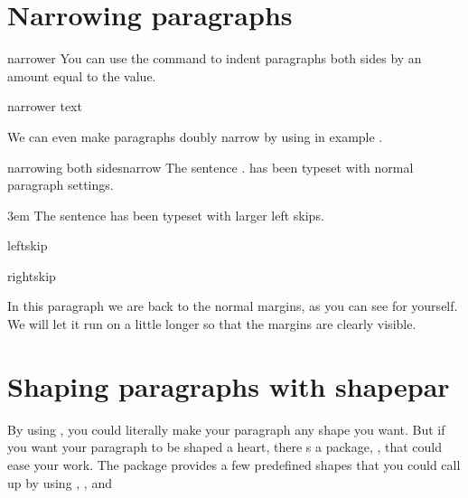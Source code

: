 \section{Narrowing paragraphs}

\begin{docCommand}{narrower}{}
You can use the command  to indent paragraphs both sides by  an amount equal to the
 value.
\end{docCommand}

\begin{teXXX}
 \def\narrower{%
   \advance\leftskip\parindent
   \advance\rightskip\parindent}
\end{teXXX}

\begin{texexample}{narrower text}{}
\onepar

\narrower\small
\onepar\par
\end{texexample}

We can even make paragraphs doubly narrow by using   in example .

\begin{texexample}{narrowing both sides}{narrow}
The sentence \fox. has been typeset with normal paragraph settings.

\parindent3em
\narrower \narrower\small 
The sentence \fox has been typeset with larger left skips.
\medskip
\end{texexample}

\begin{docCommand}{leftskip}{}
\begin{docCommand}{rightskip}{}

In this paragraph we are back to the normal margins, as you can see for yourself. We will let it run on a little longer so that the margins are clearly visible.
\end{docCommand}
\end{docCommand}




\section{Shaping paragraphs with shapepar}


By using , you could literally make your paragraph any shape you want.
But if you want your paragraph to be shaped a heart, there s a package, , that
could ease your work. The package provides a few predefined shapes that you could call
up by using , , and 

